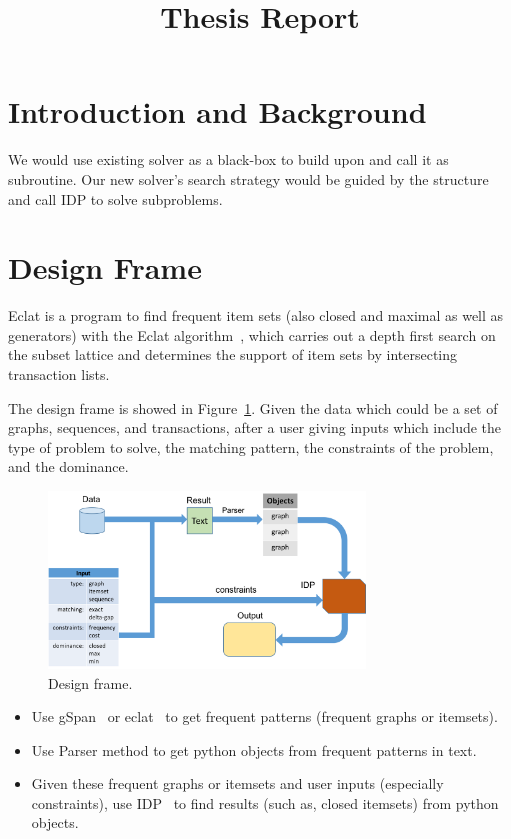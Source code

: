 \documentclass{article}
\begin{document}
\title{Thesis Report}
\maketitle

\section{Introduction and Background}

We would use existing solver as a black-box to build upon and call it as subroutine. Our new solver's search strategy would be guided by the structure and call IDP to solve subproblems.

\section{Design Frame}
Eclat is a program to find frequent item sets (also closed and maximal as well as generators) with the Eclat algorithm~\cite{zaki1997new}, which carries out a depth first search on the subset lattice and determines the support of item sets by intersecting transaction lists.

The design frame is showed in Figure~\ref{fig:frame}. Given the data which could be a set of graphs, sequences, and transactions, after a user giving inputs which include the type of problem to solve, the matching pattern, the constraints of the problem, and the dominance. 

\begin{figure}
\centering
\includegraphics[width=0.75\textwidth]{figures/structure.png}
\caption{Design frame.}
\label{fig:frame}
\end{figure}

\begin{itemize}
\item Use gSpan~\cite{yan2002gspan} or eclat~\cite{zaki1997new} to get frequent patterns (frequent graphs or itemsets).

\item Use Parser method to get python objects from frequent patterns in text.

\item Given these frequent graphs or itemsets and user inputs (especially constraints), use IDP~\cite{de2014predicate} to find results (such as, closed itemsets) from python objects.
\end{itemize}



\end{document}
